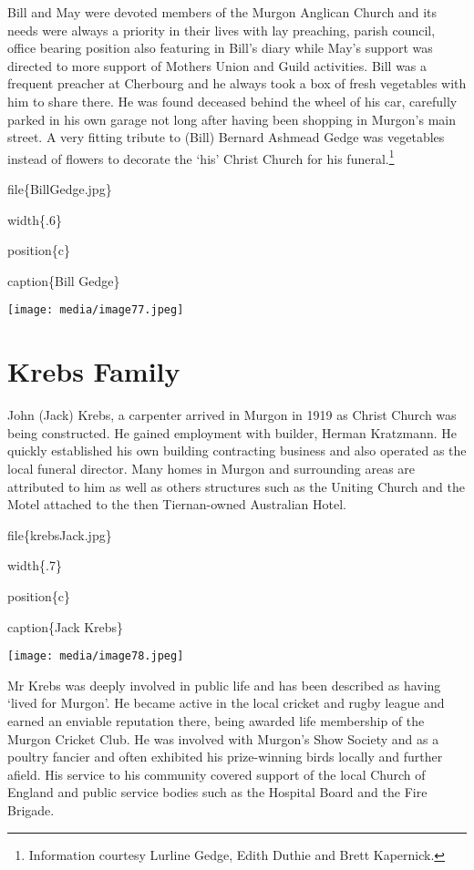 Bill and May were devoted members of the Murgon Anglican Church and its needs were always a priority in their lives with lay preaching, parish council, office bearing position also featuring in Bill's diary while May's support was directed to more support of Mothers Union and Guild activities. Bill was a frequent preacher at Cherbourg and he always took a box of fresh vegetables with him to share there. He was found deceased behind the wheel of his car, carefully parked in his own garage not long after having been shopping in Murgon's main street. A very fitting tribute to (Bill) Bernard Ashmead Gedge was vegetables instead of flowers to decorate the `his' Christ Church for his funeral.\footnote{Information courtesy Lurline Gedge, Edith Duthie and Brett Kapernick.}

file\{BillGedge.jpg\}

width\{.6\}

position\{c\}

caption\{Bill Gedge\}

\texttt{[image: media/image77.jpeg]}

\hypertarget{krebs-family}{%
\section{Krebs Family}\label{krebs-family}}

John (Jack) Krebs, a carpenter arrived in Murgon in 1919 as Christ Church was being constructed. He gained employment with builder, Herman Kratzmann. He quickly established his own building contracting business and also operated as the local funeral director. Many homes in Murgon and surrounding areas are attributed to him as well as others structures such as the Uniting Church and the Motel attached to the then Tiernan-owned Australian Hotel.

file\{krebsJack.jpg\}

width\{.7\}

position\{c\}

caption\{Jack Krebs\}

\texttt{[image: media/image78.jpeg]}

Mr Krebs was deeply involved in public life and has been described as having `lived for Murgon'. He became active in the local cricket and rugby league and earned an enviable reputation there, being awarded life membership of the Murgon Cricket Club. He was involved with Murgon's Show Society and as a poultry fancier and often exhibited his prize-winning birds locally and further afield. His service to his community covered support of the local Church of England and public service bodies such as the Hospital Board and the Fire Brigade.

